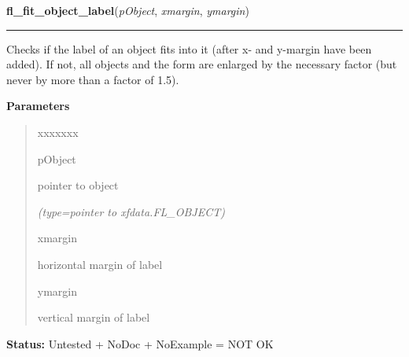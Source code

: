 \hspace{.8\funcindent}\begin{boxedminipage}{\funcwidth}

    \raggedright \textbf{fl\_fit\_object\_label}(\textit{pObject}, \textit{xmargin}, \textit{ymargin})

    \vspace{-1.5ex}

    \rule{\textwidth}{0.5\fboxrule}
\setlength{\parskip}{2ex}
    Checks if the label of an object fits into it (after x- and y-margin 
    have been added). If not, all objects and the form are enlarged by the 
    necessary factor (but never by more than a factor of 1.5).

\setlength{\parskip}{1ex}
      \textbf{Parameters}
      \vspace{-1ex}

      \begin{quote}
        \begin{Ventry}{xxxxxxx}

          \item[pObject]

          pointer to object

            {\it (type=pointer to xfdata.FL\_OBJECT)}

          \item[xmargin]

          horizontal margin of label

          \item[ymargin]

          vertical margin of label

        \end{Ventry}

      \end{quote}

\textbf{Status:} Untested + NoDoc + NoExample = NOT OK



    \end{boxedminipage}

    \label{xformslib:library:fl_get_object_geometry}

    \vspace{0.5ex}

